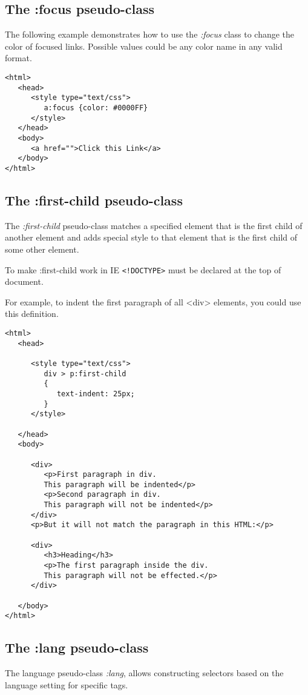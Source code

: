 \documentclass[a4paper,oneside]{book}
\numberwithin{equation}{chapter}
\begin{document}
\subsection{The :focus pseudo-class}
The following example demonstrates how to use the \textit{:focus} class to change the color of focused links. Possible values could be any color name in any valid format.
\begin{verbatim}
<html>
   <head>
      <style type="text/css">
         a:focus {color: #0000FF}
      </style>
   </head>
   <body>
      <a href="">Click this Link</a>
   </body>
</html> 
\end{verbatim}
\subsection{The :first-child pseudo-class}
The \textit{:first-child} pseudo-class matches a specified element that is the first child of another element and adds special style to that element that is the first child of some other element.

To make :first-child work in IE \verb|<!DOCTYPE>| must be declared at the top of document.

For example, to indent the first paragraph of all <div> elements, you could use this definition.
\begin{verbatim}
<html>
   <head>
   
      <style type="text/css">
         div > p:first-child
         {
            text-indent: 25px;
         }
      </style>
      
   </head>
   <body>
   
      <div>
         <p>First paragraph in div. 
         This paragraph will be indented</p>
         <p>Second paragraph in div. 
         This paragraph will not be indented</p>
      </div>
      <p>But it will not match the paragraph in this HTML:</p>
      
      <div>
         <h3>Heading</h3>
         <p>The first paragraph inside the div. 
         This paragraph will not be effected.</p>
      </div>
      
   </body>
</html>
\end{verbatim}
\subsection{The :lang pseudo-class}
The language pseudo-class \textit{:lang}, allows constructing selectors based on the language setting for specific tags.
\end{document}
